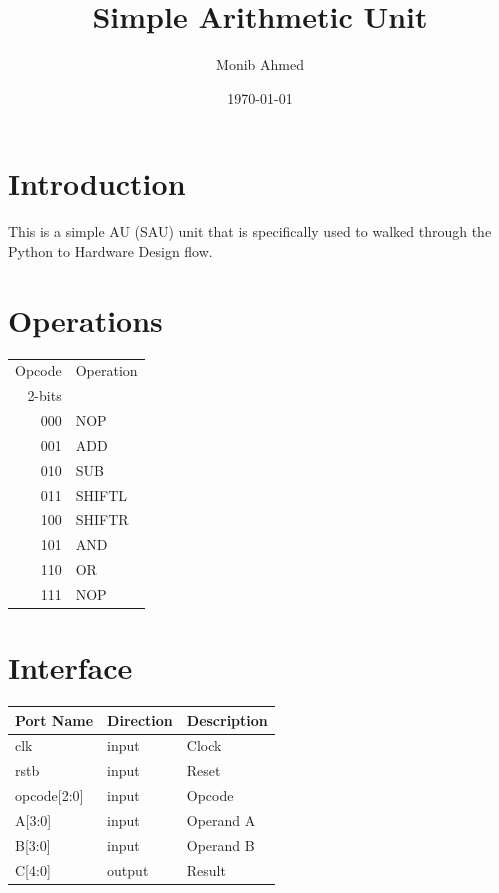 \documentclass[11pt]{article}
\author{Monib Ahmed}
\date{\today}
\title{Simple Arithmetic Unit}
\begin{document}
\maketitle
\tableofcontents


\section{Introduction}
\label{sec:org1f9f06a}
This is a simple AU (SAU) unit that is specifically used to walked
through the Python to Hardware Design flow. 

\section{Operations}
\label{sec:org5b3a8f7}
\begin{center}
\begin{tabular}{rl}
Opcode & Operation\\
2-bits & \\
\hline
000 & NOP\\
001 & ADD\\
010 & SUB\\
011 & SHIFTL\\
100 & SHIFTR\\
101 & AND\\
110 & OR\\
111 & NOP\\
\end{tabular}
\end{center}

\section{Interface}
\label{sec:org892b1e7}
\begin{center}
\begin{tabular}{lll}
Port Name & Direction & Description\\
\hline
clk & input & Clock\\
rstb & input & Reset\\
opcode[2:0] & input & Opcode\\
A[3:0] & input & Operand A\\
B[3:0] & input & Operand B\\
C[4:0] & output & Result\\
\end{tabular}
\end{center}
\end{document}
